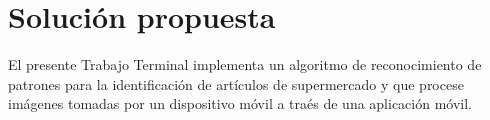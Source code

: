\section{Soluci\'on propuesta}
El presente Trabajo Terminal implementa un algoritmo de reconocimiento de patrones para la identificaci\'on de art\'iculos de supermercado y que procese im\'agenes tomadas por un dispositivo m\'ovil a tra\'es de una aplicaci\'on m\'ovil.

